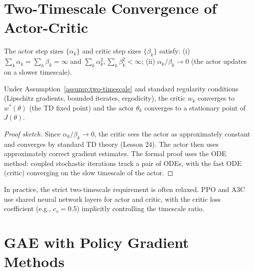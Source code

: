 \documentclass[11pt,a4paper]{article}
\begin{document}
\section{Two-Timescale Convergence of Actor-Critic}

\begin{assumption}
\label{assump:two-timescale}
The actor step sizes $\{\alpha_k\}$ and critic step sizes $\{\beta_k\}$
satisfy: (i) $\sum_k \alpha_k = \sum_k \beta_k = \infty$ and
$\sum_k \alpha_k^2, \sum_k \beta_k^2 < \infty$; (ii)
$\alpha_k / \beta_k \to 0$ (the actor updates on a slower timescale).
\end{assumption}

\begin{theorem}
\label{thm:two-timescale}
Under Assumption~\ref{assump:two-timescale} and standard regularity
conditions (Lipschitz gradients, bounded iterates, ergodicity), the
critic $w_k$ converges to $w^*(\theta)$ (the TD fixed point) and the
actor $\theta_k$ converges to a stationary point of $J(\theta)$.
\end{theorem}

\begin{proof}[Proof sketch]
Since $\alpha_k / \beta_k \to 0$, the critic sees the actor as
approximately constant and converges by standard TD theory (Lesson 24).
The actor then uses approximately correct gradient estimates. The
formal proof \citep{konda2003} uses the ODE method: coupled stochastic
iterations track a pair of ODEs, with the fast ODE (critic) converging
on the slow timescale of the actor.
\end{proof}

\begin{rlconnection}
In practice, the strict two-timescale requirement is often relaxed.
PPO and A3C use shared neural network layers for actor and critic, with
the critic loss coefficient (e.g., $c_v = 0.5$) implicitly controlling
the timescale ratio.
\end{rlconnection}

\section{GAE with Policy Gradient Methods}
\end{document}
